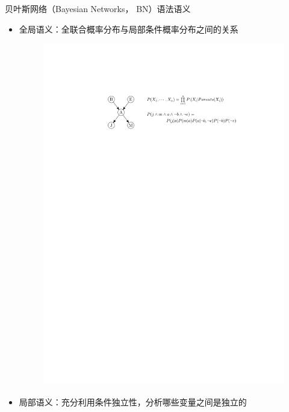 \begin{note}
    贝叶斯网络（Bayesian Networks， BN）语法语义
    \begin{itemize}
        \item 全局语义：全联合概率分布与局部条件概率分布之间的关系
        \begin{figure}[htbp]
            \centering
            \includegraphics{image/贝叶斯网络全局语法语义.pdf}
        \end{figure}
        \item 局部语义：充分利用条件独立性，分析哪些变量之间是独立的
        

\end{itemize}
\end{note}
